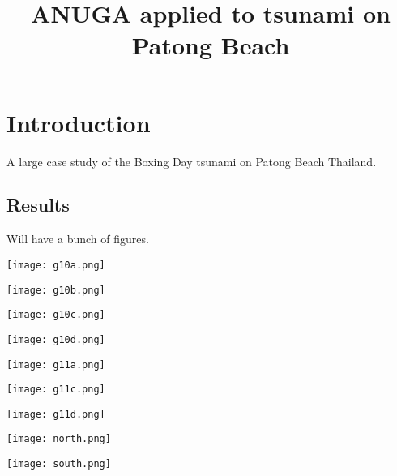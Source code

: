 \documentclass{article}
\begin{document}
\title{ANUGA applied to tsunami on Patong Beach}

\maketitle

\section{Introduction}

A large case study of the Boxing Day tsunami on Patong Beach Thailand. 

\subsection{Results}


Will have a bunch of figures.


\begin{center}
\texttt{[image: g10a.png]}
\end{center}

\begin{center}
\texttt{[image: g10b.png]}
\end{center}

\begin{center}
\texttt{[image: g10c.png]}
\end{center}

\begin{center}
\texttt{[image: g10d.png]}
\end{center}

\begin{center}
\texttt{[image: g11a.png]}
\end{center}

\begin{center}
\texttt{[image: g11c.png]}
\end{center}

\begin{center}
\texttt{[image: g11d.png]}
\end{center}

\begin{center}
\texttt{[image: north.png]}
\end{center}

\begin{center}
\texttt{[image: south.png]}
\end{center}
\end{document}
